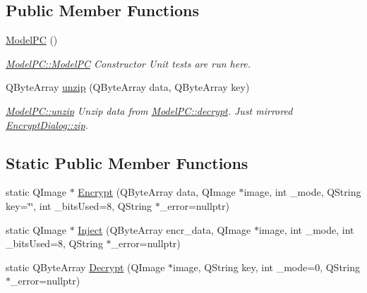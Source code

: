\subsection*{Public Member Functions}
\begin{DoxyCompactItemize}
\item 
\hyperlink{class_model_p_c_ae12ebe65ec973c02a0de4850a7c1e31c}{Model\+PC} ()
\begin{DoxyCompactList}\small\item\em \hyperlink{class_model_p_c_ae12ebe65ec973c02a0de4850a7c1e31c}{Model\+P\+C\+::\+Model\+PC} Constructor Unit tests are run here. \end{DoxyCompactList}\item 
Q\+Byte\+Array \hyperlink{class_model_p_c_a6da88f166785a49f73b22c169f956fd0}{unzip} (Q\+Byte\+Array data, Q\+Byte\+Array key)
\begin{DoxyCompactList}\small\item\em \hyperlink{class_model_p_c_a6da88f166785a49f73b22c169f956fd0}{Model\+P\+C\+::unzip} Unzip data from \hyperlink{class_model_p_c_a5995215a34a1e1f504035715a8013809}{Model\+P\+C\+::decrypt}. Just mirrored \hyperlink{class_encrypt_dialog_a2bff820a3df4ddc36ecb07ed74b7138a}{Encrypt\+Dialog\+::zip}. \end{DoxyCompactList}\end{DoxyCompactItemize}
\subsection*{Static Public Member Functions}
\begin{DoxyCompactItemize}
\item 
static Q\+Image $\ast$ \hyperlink{class_model_p_c_a271cf9285e32df58ffbfc918e6482bbd}{Encrypt} (Q\+Byte\+Array data, Q\+Image $\ast$image, int \+\_\+mode, Q\+String key=\char`\"{}\char`\"{}, int \+\_\+bits\+Used=8, Q\+String $\ast$\+\_\+error=nullptr)
\item 
static Q\+Image $\ast$ \hyperlink{class_model_p_c_ac17e68e6aab134621b0d151d74acdc82}{Inject} (Q\+Byte\+Array encr\+\_\+data, Q\+Image $\ast$image, int \+\_\+mode, int \+\_\+bits\+Used=8, Q\+String $\ast$\+\_\+error=nullptr)
\item 
static Q\+Byte\+Array \hyperlink{class_model_p_c_a902abaea4f07995b48c0f2fea6eceb7c}{Decrypt} (Q\+Image $\ast$image, Q\+String key, int \+\_\+mode=0, Q\+String $\ast$\+\_\+error=nullptr)
\end{DoxyCompactItemize}
